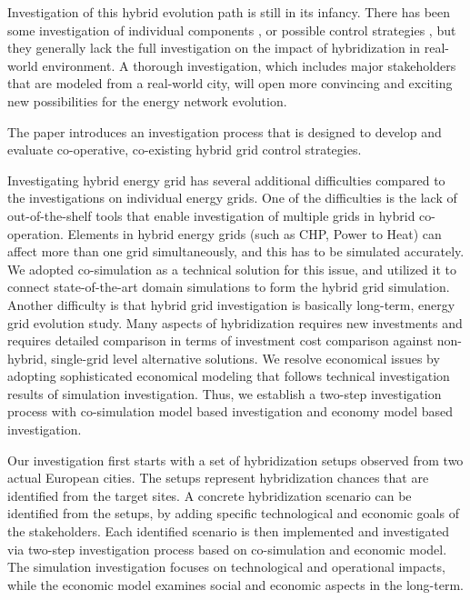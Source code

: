 \documentclass[review]{elsarticle}
\begin{document}
Investigation of this hybrid evolution path is still in its
infancy. There has been some investigation of individual components
\cite{keirstead_2012}, or possible control strategies
\cite{arnold_2009}, but they generally lack the full investigation on 
the impact of hybridization in real-world environment. A thorough 
investigation, which includes major stakeholders that are modeled
from a real-world city, will open more convincing and exciting new 
possibilities for the energy network evolution. 

The paper introduces an investigation process that is designed    
to develop and evaluate co-operative, co-existing hybrid grid control 
strategies. 

Investigating hybrid energy grid has several additional difficulties
compared to the investigations on individual energy grids. One of
the difficulties is the lack of out-of-the-shelf tools that enable
investigation of  multiple grids in hybrid co-operation. Elements in
hybrid energy grids (such as CHP, Power to Heat) can affect more than
one grid simultaneously, and this has to be simulated accurately. We
adopted co-simulation as a technical solution for this issue, and
utilized it to connect state-of-the-art domain simulations to form the
hybrid grid simulation. Another difficulty is that hybrid grid
investigation is basically long-term, energy grid evolution
study. Many aspects of hybridization requires new investments and
requires detailed comparison in terms of investment cost comparison
against non-hybrid, single-grid level alternative solutions. We
resolve economical issues by adopting sophisticated economical
modeling that follows technical investigation results of simulation
investigation. Thus, we establish a two-step investigation process
with co-simulation model based investigation and economy model based
investigation. 

Our investigation first starts with a set of hybridization setups
observed from two actual European cities. The setups represent
hybridization chances that are identified from the target sites. 
A concrete hybridization scenario can be identified from the setups,
by adding specific technological and economic goals of the
stakeholders. Each identified scenario is then implemented and
investigated via two-step investigation process based on
co-simulation and economic model. The simulation investigation 
focuses on technological and operational impacts, while the
economic model examines social and economic aspects in the
long-term. 
\end{document}
